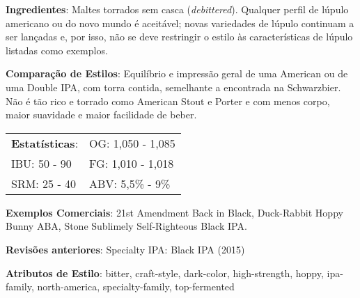 \textbf{Ingredientes}: Maltes torrados sem casca (\textit{debittered}). Qualquer perfil de lúpulo americano ou do novo mundo é aceitável; novas variedades de lúpulo continuam a ser lançadas e, por isso, não se deve restringir o estilo às características de lúpulo listadas como exemplos.

\textbf{Comparação de Estilos}: Equilíbrio e impressão geral de uma American ou de uma Double IPA, com torra contida, semelhante a encontrada na Schwarzbier. Não é tão rico e torrado como American Stout e Porter e com menos corpo, maior suavidade e maior facilidade de beber.

\begin{tabular}{@{}p{35mm}p{35mm}@{}}
  \textbf{Estatísticas}: & OG: 1,050 - 1,085 \\
  IBU: 50 - 90  & FG: 1,010 - 1,018 \\
  SRM: 25 - 40  & ABV: 5,5\% - 9\%
\end{tabular}

\textbf{Exemplos Comerciais}: 21st Amendment Back in Black, Duck-Rabbit Hoppy Bunny ABA, Stone Sublimely Self-Righteous Black IPA.

\textbf{Revisões anteriores}: Specialty IPA: Black IPA (2015)

\textbf{Atributos de Estilo}: bitter, craft-style, dark-color, high-strength, hoppy, ipa-family, north-america, specialty-family, top-fermented
